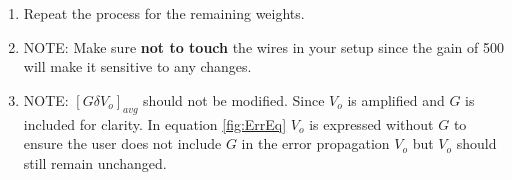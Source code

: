 \documentclass{article} %
\begin{document}
\begin{enumerate}
    \begin{enumerate}
        \item Record voltage measurement for unloaded scenario($[V_{i,1}]_{avg}$.)
        \item Load 0.4 kg weight, record voltage measurement for loaded scenario ($[V_{i,2}]_{avg}$.)
        \item Record a second voltage measurement for unloaded scenario ($[V_{i,3}]_{avg}$.)
        \begin{itemize}
            \item Your 2nd column should have two unloaded voltage values.
        \end{itemize}
        \item Subtract the unloaded from loaded: $G\delta V_{o,1}=[V_{i,2}]_{avg} -[V_{i,1}]_{avg}$ and $G\delta V_{o,2}=[V_{i,2}]_{avg} -[V_{i,3}]_{avg}$.
        \begin{itemize}
            \item Your 3rd column should have two $G\delta V_o$ values.
        \end{itemize}
        \item Average the two values: $[G\delta V_o]_{avg}=\frac{G\delta V_{o,1}+G\delta V_{o,2}}{2}$
    \end{enumerate}
    \item Repeat the process for the remaining weights.
    \item NOTE: Make sure \textbf{not to touch} the wires in your setup since the gain of 500 will make it sensitive to any changes. 
    \item NOTE: $[G \delta V_o]_{avg}$ should not be modified. Since $V_o$ is amplified and $G$ is included for clarity. In equation \ref{fig:ErrEq} $V_o$ is expressed without $G$ to ensure the user does not include $G$ in the error propagation $V_o$ but $V_o$ should still remain unchanged.
\end{enumerate}
\end{document}
